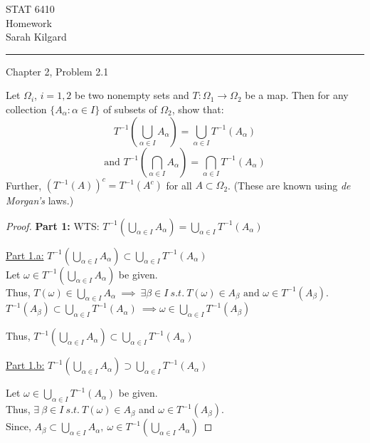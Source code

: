 \documentclass[12pt,letterpaper, onecolumn]{exam}
\newcommand{\Iunion}{\bigcup_{\alpha \in I}}
\begin{document}
\begingroup  
    \centering
    \LARGE STAT 6410\\
    \LARGE Homework \\[0.5em]
    \large Sarah Kilgard\par
\endgroup
\rule{\textwidth}{0.4pt}
\pointsdroppedatright   %
\printanswers
\renewcommand{\solutiontitle}{\noindent\textbf{Ans:}\enspace}   %

\begin{questions}
    \question Chapter 2, Problem 2.1

    Let $\Omega_i$, $i = 1, 2$ be two nonempty sets and $T: \Omega_1 \to \Omega_2$ be a map. Then for any collection $\{A_\alpha: \alpha \in I\}$ of subsets of $\Omega_2$, show that: 
    \[T^{-1}\left(\bigcup_{\alpha \in I} A_\alpha\right) = \bigcup_{\alpha \in I} T^{-1}(A_\alpha)\]
    \[\text{and } T^{-1}\left(\bigcap_{\alpha \in I}A_\alpha\right) = \bigcap_{\alpha \in I} T^{-1}(A_\alpha)\]
    Further, $(T^{-1}(A))^c = T^{-1}(A^c)$ for all $A \subset \Omega_2$. (These are known using \textit{de Morgan's} laws.)
    \begin{solution}
    \begin{proof}
        \textbf{Part 1:} WTS: $T^{-1}\left(\bigcup_{\alpha \in I} A_\alpha\right) = \bigcup_{\alpha \in I} T^{-1}(A_\alpha)$

        \underline{Part 1.a:} $T^{-1}\left(\bigcup_{\alpha \in I} A_\alpha\right) \subset \bigcup_{\alpha \in I} T^{-1}(A_\alpha)$ \\
        Let $\omega \in T^{-1}\left(\bigcup_{\alpha \in I} A_\alpha\right)$ be given. \\
        Thus, $T(\omega) \in \Iunion A_\alpha \: \implies \: \exists \beta \in I \: s.t. \: T(\omega) \in A_\beta \text{ and } \omega \in T^{-1}(A_\beta).$\\
        $T^{-1}(A_\beta) \subset \Iunion T^{-1}(A_\alpha) \: \implies \omega \in \Iunion T^{-1}(A_\beta)$

        Thus, $T^{-1}\left(\bigcup_{\alpha \in I} A_\alpha\right) \subset \bigcup_{\alpha \in I} T^{-1}(A_\alpha)$
        
        \underline{Part 1.b:} $T^{-1}\left(\bigcup_{\alpha \in I} A_\alpha\right) \supset \bigcup_{\alpha \in I} T^{-1}(A_\alpha)$

        Let $\omega \in \Iunion T^{-1}(A_\alpha)$ be given.\\
        Thus, $\exists \: \beta \in I \: s.t. \: T(\omega) \in A_\beta $ and $\omega \in T^{-1}(A_\beta)$. \\
        Since, $A_\beta \subset \Iunion A_\alpha, \: \omega \in T^{-1}(\Iunion A_\alpha)$


\end{proof}
\end{solution}
\end{questions}
\end{document}

